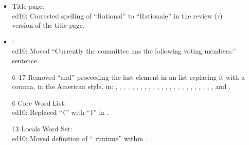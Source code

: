 	\begin{itemize}
	\item Title page: \\
		\textsf{ed10}: Corrected spelling of ``Rational'' to ``Rationale''
			in the review (r) version of the title page.

	\item {}: \\
		\textsf{ed10}: Moved ``Currently the committee has the
			following voting members:'' sentence.

	\item[6--17] Removed ``and'' proceeding the last element in an list
		replacing it with a comma, in the American style, in:
			,
			,
			,
			, \linebreak
			,
			,
			,
			, 
			,
			,
			,
			,
			, \linebreak
			,
			,
			, \linebreak
			,
			,
			, \linebreak
			,
			,
			,
			, \linebreak
			,
			 and
			.
	
	\item[6] Core Word List: \\
		\textsf{ed10}: Replaced ``\texttt{(}'' with ``\texttt{)}'' in
			.

	\item[13] Locals Word Set: \\
		\textsf{ed10}: Moved definition of ``  runtime''
		within .
	\end{itemize}

